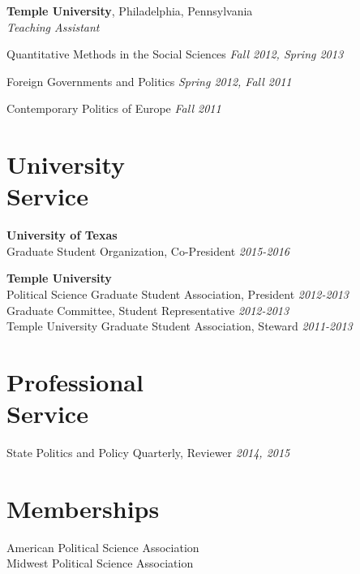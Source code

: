 \documentclass[margin,line]{res}
\newenvironment{list2}{
    \begin{list}{--}{%
        \setlength{\itemsep}{0in}
        \setlength{\parsep}{0in} \setlength{\parskip}{0in}
        \setlength{\topsep}{0in} \setlength{\partopsep}{0in}
        \setlength{\leftmargin}{0.2in}}}{\end{list}}
\begin{document}
\begin{resume}
\textbf{Temple University}, Philadelphia, Pennsylvania  \\
\emph{Teaching Assistant}

\begin{list2}
	\item Quantitative Methods in the Social Sciences \hfill {\em Fall 2012, Spring 2013}
	\item Foreign Governments and Politics \hfill {\em Spring 2012, Fall 2011}
	\item Contemporary Politics of Europe \hfill {\em Fall 2011}
\end{list2}




\section{\sc University \\Service}
{\bf University of Texas} \\
Graduate Student Organization, Co-President \hfill     {\em 2015-2016} %

{\bf Temple University}\\
Political Science Graduate Student Association, President \hfill {\em 2012-2013} \\
Graduate Committee, Student Representative \hfill {\em 2012-2013} \\
Temple University Graduate Student Association, Steward \hfill {\em 2011-2013} %

\section{\sc Professional \\Service}
State Politics and Policy Quarterly, Reviewer \hfill    {\em 2014, 2015} \\

\section{\sc Memberships}
American Political Science Association \\
Midwest Political Science Association \\



\end{resume}
\end{document}
